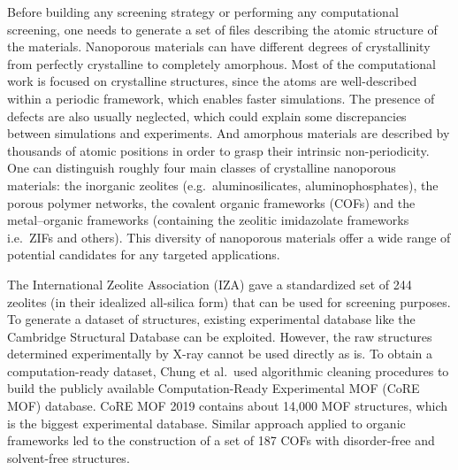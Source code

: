 \documentclass[main.tex]{subfiles}
\begin{document}
Before building any screening strategy or performing any computational screening, one needs to generate a set of files describing the atomic structure of the materials. Nanoporous materials can have different degrees of crystallinity from perfectly crystalline to completely amorphous. Most of the computational work is focused on crystalline structures, since the atoms are well-described within a periodic framework, which enables faster simulations. The presence of defects are also usually neglected, which could explain some discrepancies between simulations and experiments. And amorphous materials are described by thousands of atomic positions in order to grasp their intrinsic non-periodicity.\cite{Thyagarajan_2020} One can distinguish roughly four main classes of crystalline nanoporous materials: the inorganic zeolites (e.g.\ aluminosilicates, aluminophosphates), the porous polymer networks, the covalent organic frameworks (COFs) and the metal--organic frameworks (containing the zeolitic imidazolate frameworks i.e.\ ZIFs and others). This diversity of nanoporous materials offer a wide range of potential candidates for any targeted applications.

The International Zeolite Association (IZA) gave a standardized set of 244 zeolites (in their idealized all-silica form) that can be used for screening purposes. To generate a dataset of structures, existing experimental database like the Cambridge Structural Database can be exploited. However, the raw structures determined experimentally by X-ray cannot be used directly as is. To obtain a computation-ready dataset, Chung et al.\ used algorithmic cleaning procedures to build the publicly available Computation-Ready Experimental MOF (CoRE MOF) database.\cite{Chung_2014, Chung_2019} CoRE MOF 2019 contains about 14,000 MOF structures, which is the biggest experimental database. Similar approach applied to organic frameworks led to the construction of a set of 187 COFs with disorder-free and solvent-free structures.\cite{Tong_2017,Ongari_2019}
\end{document}
